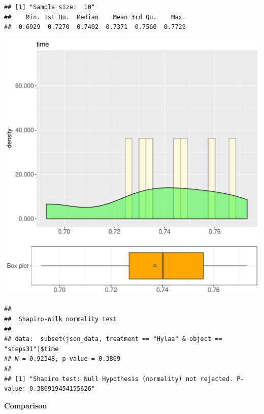 \documentclass{article}\usepackage[]{graphicx}\usepackage[]{color}
\makeatletter
\def\maxwidth{ %
  \ifdim\Gin@nat@width>\linewidth
    \linewidth
  \else
    \Gin@nat@width
  \fi
}
\newenvironment{kframe}{%
 \def\at@end@of@kframe{}%
 \ifinner\ifhmode%
  \def\at@end@of@kframe{\end{minipage}}%
  \begin{minipage}{\columnwidth}%
 \fi\fi%
 \def\FrameCommand##1{\hskip\@totalleftmargin \hskip-\fboxsep
 \colorbox{shadecolor}{##1}\hskip-\fboxsep
     \hskip-\linewidth \hskip-\@totalleftmargin \hskip\columnwidth}%
 \MakeFramed {\advance\hsize-\width
   \@totalleftmargin\z@ \linewidth\hsize
   \@setminipage}}%
 {\par\unskip\endMakeFramed%
 \at@end@of@kframe}
\newenvironment{knitrout}{}{} %
\makeatother
\begin{document}
\begin{knitrout}
\color{fgcolor}\begin{kframe}
\begin{verbatim}
## [1] "Sample size:  10"
##    Min. 1st Qu.  Median    Mean 3rd Qu.    Max. 
##  0.6929  0.7270  0.7402  0.7371  0.7560  0.7729
\end{verbatim}
\end{kframe}
\includegraphics[width=\maxwidth]{figure/RH3_Hylaa_steps31-1} 
\begin{kframe}\begin{verbatim}
## 
## 	Shapiro-Wilk normality test
## 
## data:  subset(json_data, treatment == "Hylaa" & object == "steps31")$time
## W = 0.92348, p-value = 0.3869
## 
## [1] "Shapiro test: Null Hypothesis (normality) not rejected. P-value: 0.386919454155626"
\end{verbatim}
\end{kframe}
\end{knitrout}
  
 \textbf{Comparison}
  
\end{document}
